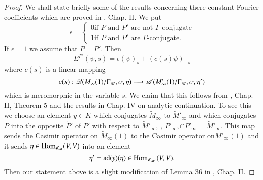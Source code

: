 \begin{proof}
We shall state briefly some of the results concerning there constant Fourier coefficients which are proved in \cite{art5-key8}, Chap. II. We put
$$
\epsilon = 
\begin{cases}
0 \text{if $P$ and $P'$ are not $\Gamma$-conjugate}\\
1 \text{if $P$ and $P'$ are $\Gamma$-conjugate.}
\end{cases}
$$
If $\epsilon =1$ we assume that $P = P'$. Then
$$
E^{P'} (\psi, s) =\epsilon (\psi)_s + (c (s) \psi)_{-s}
$$
where $c(s)$ is a linear mapping
$$
c(s) : \mathscr{Q} (M_\infty (1)/ \Gamma_M, \sigma, \eta) \longrightarrow \mathscr{A} (M'_\infty (1)/ \Gamma_M, \sigma, \eta')
$$
which is meromorphic in the variable $s$. We claim that this follows from \cite{art5-key8}, Chap. II, Theorem 5 and the results in Chap. IV on analytic continuation. To see this we choose  an element $y \in K$ which conjugates $\tilde{M}_\infty$ to $\tilde{M}'_{\infty}$ and which conjugates $P$ into the opposite $\tilde{P'}$ of $P'$ with respect to $\tilde{M}'_\infty$, \ie, $\bar{P}'_\infty, \cap P'_\infty = \tilde{M}'_\infty$. This map sends the Casimir operator on $\tilde{M}_\infty (1)$ to the Casimir operator on$M'_\infty (1)$ and it sends $\eta \in \operatorname{Hom}_{K_M} (V, V)$ into an element
$$
\eta' = \operatorname{ad} (y) (\eta) \in \operatorname{Hom}_{K_{M'}} (V, V).
$$
Then our statement above is a slight modification of Lemma 36 in \cite{art5-key8}, Chap. II.


\end{proof}
